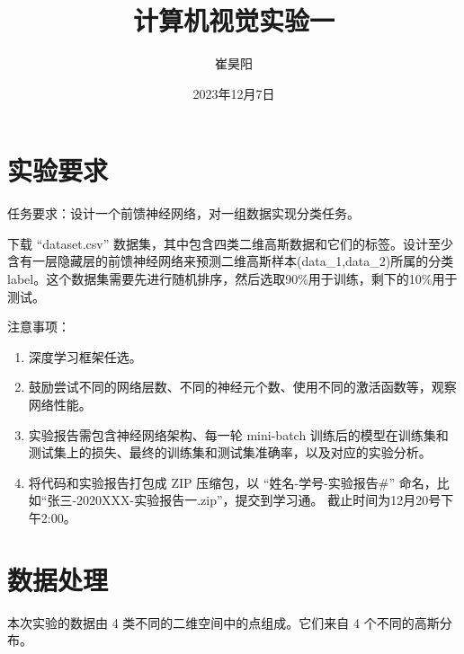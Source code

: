 \documentclass[supercite]{Experimental_Report}
\title{~~~~~~计算机视觉实验一~~~~~~}
\author{崔昊阳}
\date{2023年12月7日}
\theoremstyle{definition}
\begin{document}
\maketitle

\clearpage


\tableofcontents[level=2]

\clearpage


\section{实验要求}
任务要求：设计一个前馈神经网络，对一组数据实现分类任务。

下载 “dataset.csv” 数据集，其中包含四类二维高斯数据和它们的标签。设计至少含有一层隐藏层的前馈神经网络来预测二维高斯样本(data\_1,data\_2)所属的分类label。这个数据集需要先进行随机排序，然后选取90\%用于训练，剩下的10\%用于测试。

注意事项：
\begin{enumerate}
	\item 深度学习框架任选。
	\item 鼓励尝试不同的网络层数、不同的神经元个数、使用不同的激活函数等，观察网络性能。
	\item 实验报告需包含神经网络架构、每一轮 mini-batch 训练后的模型在训练集和测试集上的损失、最终的训练集和测试集准确率，以及对应的实验分析。
	\item 将代码和实验报告打包成 ZIP 压缩包，以 “姓名-学号-实验报告\#” 命名，比如“张三-2020XXX-实验报告一.zip”，提交到学习通。
	截止时间为12月20号下午2:00。
\end{enumerate}

\section{数据处理}
本次实验的数据由 4 类不同的二维空间中的点组成。它们来自 4 个不同的高斯分布。
\end{document}
